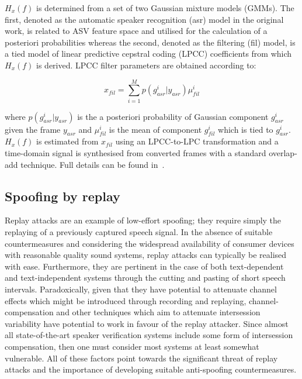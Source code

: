 $H_x(f)$ is determined from a set of two Gaussian mixture models (GMMs).  The first, denoted as the automatic speaker recognition (asr) model in the original work, is related to ASV feature space and utilised for the calculation of a posteriori probabilities whereas the second, denoted as the filtering (fil) model, is a tied model of linear predictive cepstral coding (LPCC) coefficients from which $H_x(f)$ is derived.  LPCC filter parameters are obtained according to:

\begin{equation}
x_{fil} = \sum\limits_{i=1}^{M}p(g_{asr}^{i}|y_{asr}) \mu_{fil}^{i}
\label{eq:EMit}
\end{equation}

\noindent where $p(g_{asr}^{i}|y_{asr})$ is the a posteriori probability of Gaussian component $g_{asr}^{i}$ given the frame $y_{asr}$ and $\mu_{fil}^{i}$ is the mean of component $g_{fil}^{i}$ which is tied to $g_{asr}^{i}$.  $H_{x}(f)$ is estimated from $x_{fil}$ using an LPCC-to-LPC transformation and a time-domain signal is synthesised from converted frames with a standard overlap-add technique. Full details can be found in~\cite{Bonastre2007,Matrouf2005,Bonastre2006}.


\subsection{Spoofing by replay}

Replay attacks are an example of low-effort spoofing; they require simply the replaying of a previously captured speech signal.  
In the absence of suitable countermeasures and considering the widespread availability of consumer devices with reasonable quality sound systems, replay attacks can typically be realised with ease.  
Furthermore, they are pertinent in the case of both text-dependent and text-independent systems through the cutting and pasting of short speech intervals.  
Paradoxically, given that they have potential to attenuate channel effects which might be introduced through recording and replaying, channel-compensation and other techniques which aim to attenuate intersession variability have potential to work in favour of the replay attacker.
Since almost all state-of-the-art speaker verification systems include some form of intersession compensation, then one must consider most systems at least somewhat vulnerable. 
All of these factors point towards the significant threat of replay attacks and the importance of developing suitable anti-spoofing countermeasures.

